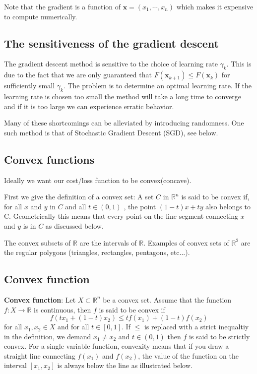 \documentclass[%
oneside,                 %
final,                   %
10pt]{article}
\begin{document}
Note that the gradient is a function of $\mathbf{x} =
(x_1,\cdots,x_n)$ which makes it expensive to compute numerically.


\subsection*{The sensitiveness of the gradient descent}

The gradient descent method 
is sensitive to the choice of learning rate $\gamma_k$. This is due
to the fact that we are only guaranteed that $F(\mathbf{x}_{k+1}) \leq
F(\mathbf{x}_k)$ for sufficiently small $\gamma_k$. The problem is to
determine an optimal learning rate. If the learning rate is chosen too
small the method will take a long time to converge and if it is too
large we can experience erratic behavior.

Many of these shortcomings can be alleviated by introducing
randomness. One such method is that of Stochastic Gradient Descent
(SGD), see below.


\subsection*{Convex functions}

Ideally we want our cost/loss function to be convex(concave).

First we give the definition of a convex set: A set $C$ in
$\mathbb{R}^n$ is said to be convex if, for all $x$ and $y$ in $C$ and
all $t \in (0,1)$ , the point $(1 − t)x + ty$ also belongs to
C. Geometrically this means that every point on the line segment
connecting $x$ and $y$ is in $C$ as discussed below.

The convex subsets of $\mathbb{R}$ are the intervals of
$\mathbb{R}$. Examples of convex sets of $\mathbb{R}^2$ are the
regular polygons (triangles, rectangles, pentagons, etc...).

\subsection*{Convex function}

\textbf{Convex function}: Let $X \subset \mathbb{R}^n$ be a convex set. Assume that the function $f: X \rightarrow \mathbb{R}$ is continuous, then $f$ is said to be convex if $$f(tx_1 + (1-t)x_2) \leq tf(x_1) + (1-t)f(x_2) $$ for all $x_1, x_2 \in X$ and for all $t \in [0,1]$. If $\leq$ is replaced with a strict inequaltiy in the definition, we demand $x_1 \neq x_2$ and $t\in(0,1)$ then $f$ is said to be strictly convex. For a single variable function, convexity means that if you draw a straight line connecting $f(x_1)$ and $f(x_2)$, the value of the function on the interval $[x_1,x_2]$ is always below the line as illustrated below.
\end{document}
